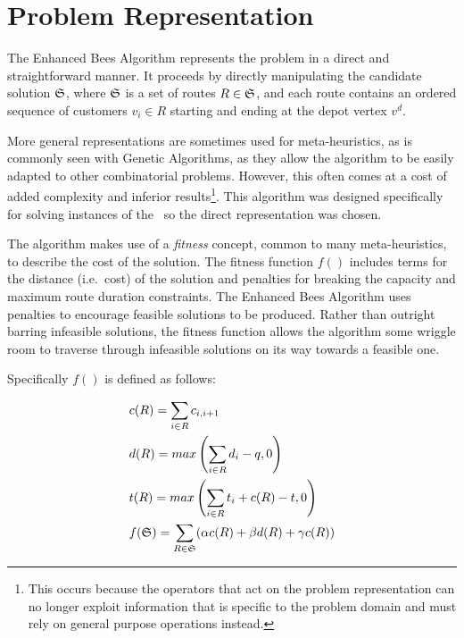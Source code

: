 \section{Problem Representation}
\label{sec:problemrepresentation}

The Enhanced Bees Algorithm represents the problem in a direct and straightforward manner. It proceeds by directly manipulating the candidate solution $\mathfrak{S}$, where $\mathfrak{S}$ is a set of routes $R \in \mathfrak{S}$, and each route contains an ordered sequence of customers $v_i \in R$ starting and ending at the depot vertex $v^d$.


More general representations are sometimes used for meta-heuristics, as is commonly seen with Genetic Algorithms, as they allow the algorithm to be easily adapted to other combinatorial problems. However, this often comes at a cost of added complexity and inferior results\footnote{This occurs because the operators that act on the problem representation can no longer exploit information that is specific to the problem domain and must rely on general purpose operations instead.}. This algorithm was designed specifically for solving instances of the \VRP\ so the direct representation was chosen.

The algorithm makes use of a \emph{fitness} concept, common to many meta-heuristics, to describe the cost of the solution. The fitness function $f()$ includes terms for the distance (i.e.~cost) of the solution and penalties for breaking the capacity and maximum route duration constraints. The Enhanced Bees Algorithm uses penalties to encourage feasible solutions to be produced. Rather than outright barring infeasible solutions, the fitness function allows the algorithm some wriggle room to traverse through infeasible solutions on its way towards a feasible one.

Specifically $f()$ is defined as follows:

\begin{align}
   & c(R) = \sum_{i \in R} c_{i, i+1} \\
   & d(R) = max\left( \sum_{i \in R} d_i - q, 0 \right)  \\
   & t(R) = max\left( \sum_{i \in R} t_i + c(R) - t, 0 \right)  \\
   & f(\mathfrak{S}) = \sum_{R \in \mathfrak{S}} (\alpha c(R) + \beta d(R) + \gamma c(R))
\end{align}

